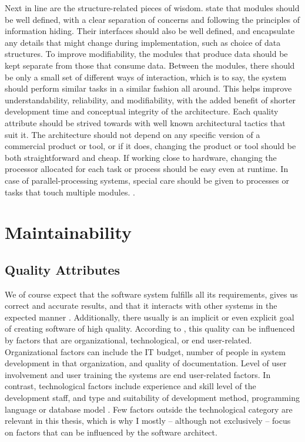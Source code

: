 \documentclass[utf8,english]{gradu3}
\begin{document}
Next in line are the structure-related pieces of wisdom.
\textcite[16]{Bass1998} state that modules should be well defined, with a clear
separation of concerns and following the principles of information hiding. Their
interfaces should also be well defined, and encapsulate any details that might
change during implementation, such as choice of data structures. To improve
modifiability, the modules that produce data should be kept separate from those
that consume data. Between the modules, there should be only a small set of
different ways of interaction, which is to say, the system should perform
similar tasks in a similar fashion all around. This helps improve
understandability, reliability, and modifiability, with the added benefit of
shorter development time and conceptual integrity of the architecture. Each
quality attribute should be strived towards with well known architectural
tactics that suit it. The architecture should not depend on any specific version
of a commercial product or tool, or if it does, changing the product or tool
should be both straightforward and cheap. If working close to hardware, changing
the processor allocated for each task or process should be easy even at runtime.
In case of parallel-processing systems, special care should be given to
processes or tasks that touch multiple modules. \parencite[16]{Bass1998}.


\section{Maintainability}

\subsection{Quality Attributes}

We of course expect that the software system fulfills all its requirements, gives us correct and
accurate results, and that it interacts with other systems in the expected manner
\parencite[76]{Bass1998}. Additionally, there usually is an implicit or even explicit goal of creating software of high quality.
According to \textcite[602]{Gorla2010}, this quality
can be influenced by factors that are organizational,
technological, or end user-related. Organizational factors can
include the IT budget, number of people in system development in that
organization, and quality of documentation. Level of user involvement and user
training the systems are end user-related factors. In contrast, technological
factors include experience and skill level of the development staff, and type
and suitability of development method, programming language or database model
\parencite[602]{Gorla2010}. Few factors outside the technological category are
relevant in this thesis, which is why I mostly -- although not exclusively --
focus on factors that can be influenced by the software architect.
\end{document}
